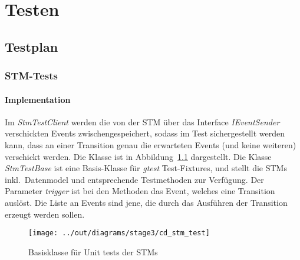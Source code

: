\chapter{Testen}\label{ch:testen}



\section{Testplan}\label{sec:testplan}




\subsection{STM-Tests}\label{subsec:stm-tests}


\subsubsection{Implementation}
Im \textit{StmTestClient} werden die von der STM über das Interface \textit{IEventSender}
verschickten Events zwischengespeichert, sodass im Test
sichergestellt werden kann, dass an einer Transition genau die erwarteten Events (und keine weiteren)
verschickt werden.
Die Klasse ist in Abbildung~\ref{fig:cd_basis_stm_test} dargestellt.
Die Klasse \textit{StmTestBase} ist eine Basis-Klasse für \textit{gtest} Test-Fixtures,
und stellt die STMs inkl.\ Datenmodel und entsprechende Testmethoden zur Verfügung.
Der Parameter \textit{trigger} ist bei den Methoden das Event, welches eine Transition auslöst.
Die Liste an Events sind jene, die durch das Ausführen der Transition erzeugt werden sollen.

\begin{figure}[h]
    \centering
    \texttt{[image: ../out/diagrams/stage3/cd\_stm\_test]}
    \caption{Basisklasse für Unit tests der STMs}
    \label{fig:cd_basis_stm_test}
\end{figure}


